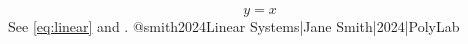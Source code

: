 \begin{equation}\label{eq:linear}
y = x
\end{equation}
See \ref{eq:linear} and \cite{smith2024}.
@smith2024{Linear Systems|Jane Smith|2024|PolyLab}